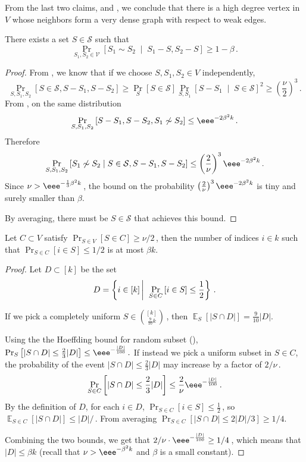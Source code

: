 \documentclass{toc}
\newcommand{\Prob}[2][]{\Pr_{{#1}}\left[#2\right]} %
\DeclareMathOperator*{\E}{\mathbb{E}} %
\newcommand{\Ex}[2][]{\E_{{#1}}\Brac{#2}} %
\newcommand{\Paren}[1]{\left(#1\right)} %
\newcommand{\Brac}[1]{\left[#1\right]} %
\newcommand{\abs}[1]{\lvert#1\rvert} %
\newcommand{\given}{\;\middle\vert\;} %
\newcommand\sett[2]{\left\{ #1 \left| \; \vphantom{#1 #2} \right. #2  \right\}} %
\newcommand\wconn{\sim} %
\newcommand\sconn{-} %
\begin{document}
From the last two claims,  and , we conclude that there is a high degree vertex in $V$ whose neighbors form a very dense graph with respect to weak edges.
\begin{claim} \label{claim:almost clique}
	There exists a set $S\in\mathcal{S}$ such that
	\[\Prob[S_1,S_2\in\mathcal{V}]{S_1\wconn S_2 \given S_1\sconn S,S_2\sconn S} \geq 1-\beta\,.\]%
\end{claim}
\begin{proof}
	From , we know that if we choose $S,S_1,S_2\in V$ independently,
	\[\Prob[S,S_1,S_2]{S\in\mathcal{S},S\sconn S_1,S\sconn S_2} \geq \Prob[S]{S\in\mathcal{S}}\Prob[S,S_1]{S\sconn S_1\given S\in \mathcal{S}}^2\geq \Paren{\frac{\nu}{2}}^3 \,.\]%
	From , on the same distribution
	\[\Prob[S,S_1,S_2]{S\sconn S_1,S\sconn S_2,S_1\not\wconn S_2} \leq \eee^{-2\beta^2 k}\,.\]%
	Therefore
	\[\Prob[S,S_1,S_2]{S_1\not\wconn S_2\given S\in\mathcal{S}, S\sconn S_1,S\sconn S_2} \leq \Paren{\frac{2}{\nu}}^3 \eee^{-2\beta^2 k}\,. \]%
	Since $\nu > \eee^{-\frac{1}{3}\beta^2 k}$\,, the bound on the probability $\Paren{\frac{2}{\nu}}^3 \eee^{-2\beta^2 k}$ is tiny and surely smaller than $\beta$.
	
%
By  %
averaging, there must be ${S}\in\mathcal{S}$ that achieves this bound.
\end{proof}

\begin{claim}\label{claim:half index}
	Let $C\subset V$ satisfy $\Pr_{S\in V}[S\in C]\geq 
 \nu/2$\,, %
 then the number of indices $i\in k$ such that $\Prob[S\in C]{i\in S}\leq 
	1/2$ %
	 is at most $\beta k$.
\end{claim}
\begin{proof}
	Let $D\subset[k]$ be the set
	\[ D = \sett{i\in [k]}{\Prob[S\in C]{i\in S}\leq \frac{1}{2}}\,.\]%
	
	If we pick a completely uniform $S\in\binom{[k]}{\frac{9}{10}k}$\,, then $\Ex[S]{\abs{S\cap D}} = \frac{9}{10}\abs{D}.$

Using
the  %
%
%
the Hoeffding bound for random subset (), %
%
$\Prob[S]{\abs{S\cap D} \leq \frac{2}{3}\abs{D}} \leq 
	\eee^{-\frac{\abs{D}}{100}}\,.$
	If instead we pick a uniform subset in $S\in C$, the probability of the event $\abs{S\cap D} \leq \frac{2}{3}\abs{D}$ may increase by a factor of 
	$2/\nu$\,. %
	\[ \Prob[S\in C]{\abs{S\cap D} \leq \frac{2}{3}\abs{D}} \leq \frac{2}{\nu}\eee^{-\frac{\abs{D}}{100}}\,.\]%
	By the definition of $D$, for each $i\in D$, $\Prob[S\in C]{i\in S} \leq \frac{1}{2}$\,, so $\Ex[S\in C]{\abs{S\cap D}} \leq 
	\abs{D}/$\,.
	From averaging $\Prob[S\in C]{\abs{S\cap D} \leq 
%
	2\abs{D}/3%
	} \geq 
	1/4.$ %
	
	Combining the two bounds, we get that 
       $2/\nu\cdot\eee^{-\frac{\abs{D}}{100}} \geq 1/4 $\,,  %
%
	 which means that $\abs{D}\leq \beta k$ (recall that $\nu > \eee^{-\beta^2 k}$ and $\beta$ is a small constant).
\end{proof}
\end{document}
